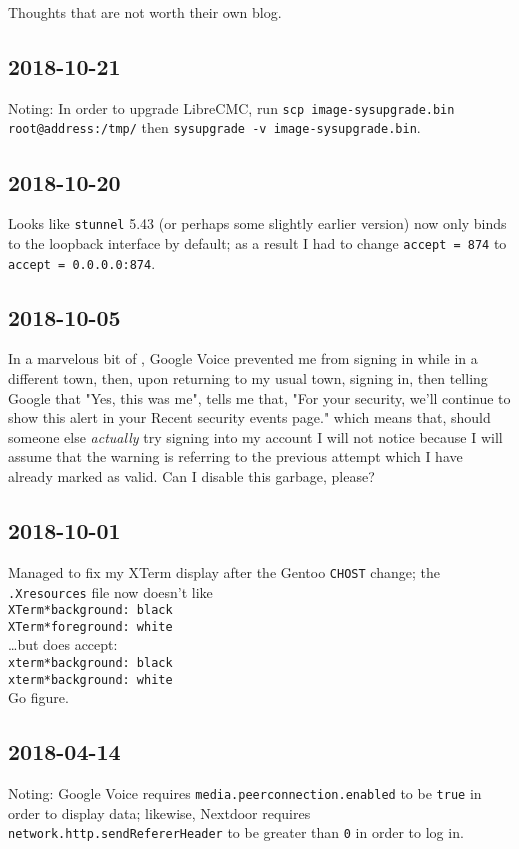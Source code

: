 \documentclass{article}
\begin{document}
Thoughts that are not worth their own blog.

\subsection{2018-10-21}
Noting: In order to upgrade LibreCMC, run \texttt{scp image-sysupgrade.bin root@address:/tmp/} then \texttt{sysupgrade -v image-sysupgrade.bin}.

\subsection{2018-10-20}
Looks like \texttt{stunnel} 5.43 (or perhaps some slightly earlier version) now only binds to the loopback interface by default; as a result I had to change \texttt{accept = 874} to \texttt{accept = 0.0.0.0:874}.

\subsection{2018-10-05}
In a marvelous bit of , Google Voice prevented me from signing in while in a different town, then, upon returning to my usual town, signing in, then telling Google that "Yes, this was me", tells me that, "For your security, we'll continue to show this alert in your Recent security events page." which means that, should someone else \emph{actually} try signing into my account I will not notice because I will assume that the warning is referring to the previous attempt which I have already marked as valid.  Can I disable this garbage, please?

\subsection{2018-10-01}
Managed to fix my XTerm display after the Gentoo \texttt{CHOST} change; the \texttt{.Xresources} file now doesn't like \\
    \texttt{XTerm*background: black} \\
    \texttt{XTerm*foreground: white} \\
\ldots but does accept: \\
    \texttt{xterm*background: black} \\
    \texttt{xterm*background: white} \\
Go figure.

\subsection{2018-04-14}
Noting: Google Voice requires \texttt{media.peerconnection.enabled} to be \texttt{true} in order to display data; likewise, Nextdoor requires \texttt{network.http.sendRefererHeader} to be greater than \texttt{0} in order to log in.
\end{document}
